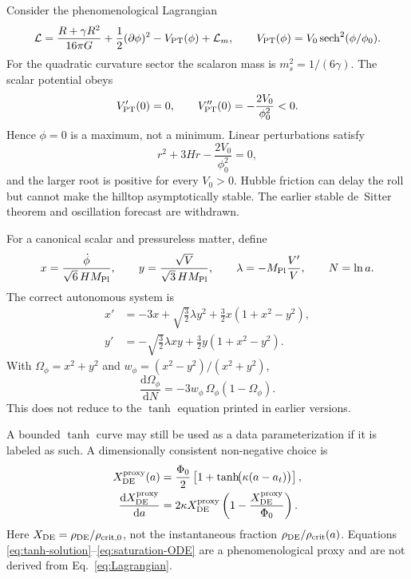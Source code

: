 \documentclass[12pt,a4paper]{article}
\theoremstyle{definition}
\theoremstyle{plain}
\theoremstyle{remark}
\newcommand{\dd}{\mathrm{d}}
\begin{document}
Consider the phenomenological Lagrangian
\begin{equation}\label{eq:Lagrangian}
 \mathcal L=
 \frac{R+\gamma R^2}{16\pi G}
 +\frac12(\partial\phi)^2
 -V_{\rm PT}(\phi)+\mathcal L_m ,
 \qquad
 V_{\rm PT}(\phi)=V_0\,{\rm sech}^2(\phi/\phi_0).
\end{equation}
For the quadratic curvature sector the scalaron mass is
\(m_s^2=1/(6\gamma)\).  The scalar potential obeys
\begin{equation}\label{eq:VPT-curvature}
 V_{\rm PT}'(0)=0,\qquad
 V_{\rm PT}''(0)=-\frac{2V_0}{\phi_0^2}<0 .
\end{equation}
Hence \(\phi=0\) is a maximum, not a minimum.  Linear perturbations satisfy
\[
 r^2+3Hr-\frac{2V_0}{\phi_0^2}=0 ,
\]
and the larger root is positive for every \(V_0>0\).  Hubble friction can
delay the roll but cannot make the hilltop asymptotically stable.  The earlier
stable de~Sitter theorem and oscillation forecast are withdrawn.

For a canonical scalar and pressureless matter, define
\[
 x=\frac{\dot\phi}{\sqrt6\,HM_{\rm Pl}},\qquad
 y=\frac{\sqrt{V}}{\sqrt3\,HM_{\rm Pl}},\qquad
 \lambda=-M_{\rm Pl}\frac{V'}{V},\qquad N=\ln a .
\]
The correct autonomous system is
\begin{align}
 x'&=-3x+\sqrt{\frac32}\lambda y^2
      +\frac32x(1+x^2-y^2),\label{eq:dx}\\
 y'&=-\sqrt{\frac32}\lambda xy
      +\frac32y(1+x^2-y^2).\label{eq:dy}
\end{align}
With \(\Omega_\phi=x^2+y^2\) and
\(w_\phi=(x^2-y^2)/(x^2+y^2)\),
\begin{equation}\label{eq:dOmega-exact}
 \frac{\dd\Omega_\phi}{\dd N}
 =-3w_\phi\,\Omega_\phi(1-\Omega_\phi).
\end{equation}
This does not reduce to the $\tanh$ equation printed in earlier versions.

A bounded $\tanh$ curve may still be used as a data parameterization if it is
labeled as such.  A dimensionally consistent non-negative choice is
\begin{align}
 X_{\rm DE}^{\rm proxy}(a)
 &=\frac{\Phi_0}{2}\left[1+
 \tanh\!\bigl(\kappa(a-a_t)\bigr)\right],\label{eq:tanh-solution}\\
 \frac{\dd X_{\rm DE}^{\rm proxy}}{\dd a}
 &=2\kappa X_{\rm DE}^{\rm proxy}
 \left(1-\frac{X_{\rm DE}^{\rm proxy}}{\Phi_0}\right).
 \label{eq:saturation-ODE}
\end{align}
Here \(X_{\rm DE}=\rho_{\rm DE}/\rho_{\rm crit,0}\), not the instantaneous
fraction \(\rho_{\rm DE}/\rho_{\rm crit}(a)\).  Equations
\eqref{eq:tanh-solution}--\eqref{eq:saturation-ODE} are a phenomenological
proxy and are not derived from Eq.~\eqref{eq:Lagrangian}.
\end{document}
